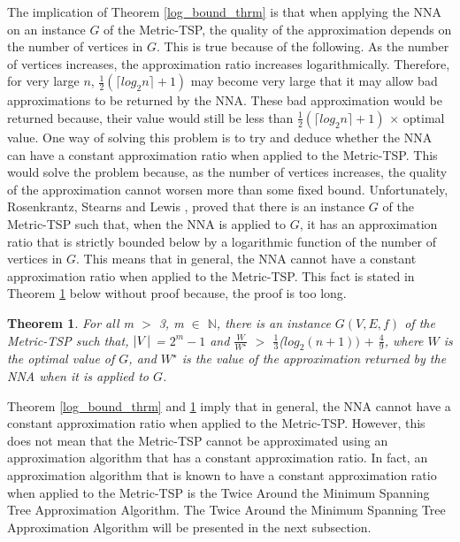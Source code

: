 \documentclass[12pt]{article}
\newtheorem{theorem}[definition]{Theorem}
\numberwithin{equation}{subsection}
\numberwithin{table}{subsection}
\numberwithin{algorithm}{subsection}
\numberwithin{figure}{subsection}
\begin{document}
The implication of Theorem \ref{log_bound_thrm} is that when applying the NNA on an instance $G$ of the Metric-TSP, the quality of the approximation depends on the number of vertices in $G$. This is true because of the following. As the number of vertices increases, the approximation ratio increases logarithmically. Therefore, for very large $n$, $\frac{1}{2}(\lceil log_2 n \rceil + 1)$ may become very large that it may allow bad approximations to be returned by the NNA. These bad approximation would be returned because, their value would still be less than $\frac{1}{2}(\lceil log_2 n \rceil + 1)$ $\times$ optimal value. One way of solving this problem is to try and deduce whether the NNA can have a constant approximation ratio when applied to the Metric-TSP. This would solve the problem because, as the number of vertices increases, the quality of the approximation cannot worsen more than some fixed bound. Unfortunately, Rosenkrantz, Stearns and Lewis \cite{Rosenkrantz}, proved that there is an instance $G$ of the Metric-TSP such that, when the NNA is applied to $G$, it has an approximation ratio that is strictly bounded below by a logarithmic function of the number of vertices in $G$. This means that in general, the NNA cannot have a constant approximation ratio when applied to the Metric-TSP. This fact is stated in Theorem \ref{no_proof} below without proof because, the proof is too long.
\begin{theorem}
\label{no_proof}
For all m $>$ 3, m $\in$ $\mathbb{N}$, there is an instance $G(V,E,f)$ of the Metric-TSP such that, $\abs{V}$ = $2^m - 1$ and $\frac{W}{W^\star}$ $>$ $\frac{1}{3}$($log_2 (n+1))$ $+$ $\frac{4}{9}$, where $W$ is the optimal value of $G$, and $W^\star$ is the value of the approximation returned by the NNA when it is applied to $G$.{}
\end{theorem}
Theorem \ref{log_bound_thrm} and \ref{no_proof} imply that in general, the NNA cannot have a constant approximation ratio when applied to the Metric-TSP. However, this does not mean that the Metric-TSP cannot be approximated using an approximation algorithm that has a constant approximation ratio. In fact, an approximation algorithm that is known to have a constant approximation ratio when applied to the Metric-TSP is the Twice Around the Minimum Spanning Tree Approximation Algorithm. The Twice Around the Minimum Spanning Tree Approximation Algorithm will be presented in the next subsection.    
\end{document}
